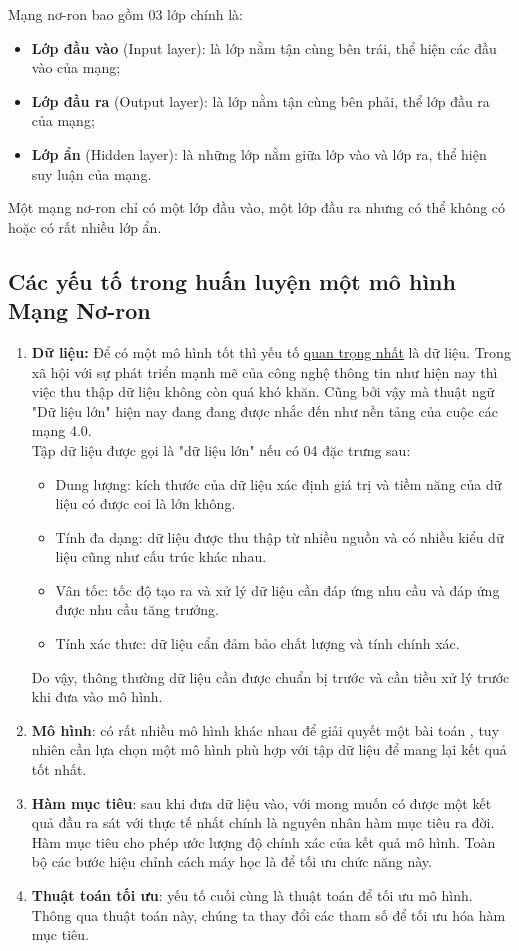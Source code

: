 \documentclass[11pt,a4paper]{article}
\numberwithin{equation}{subsection}
\numberwithin{figure}{subsection}
\numberwithin{table}{subsection}
\begin{document}
Mạng nơ-ron bao gồm 03 lớp chính là:
\begin{itemize}
	\item \textbf{Lớp đầu vào} (Input layer): là lớp nằm tận cùng bên trái, thể hiện các đầu vào của mạng;
	\item \textbf{Lớp đầu ra} (Output layer): là lớp nằm tận cùng bên phải, thể lớp đầu ra của mạng;
	\item \textbf{Lớp ẩn} (Hidden layer): là những lớp nằm giữa lớp vào và lớp ra, thể hiện suy luận của mạng.
\end{itemize}
Một mạng nơ-ron chỉ có một lớp đầu vào, một lớp đầu ra nhưng có thể không có hoặc có rất nhiều lớp ẩn.

\subsection{Các yếu tố trong huấn luyện một mô hình Mạng Nơ-ron}
\begin{enumerate}[-]
\item \textbf{Dữ liệu:} Để có một mô hình tốt thì yếu tố \underline{quan trọng nhất} là dữ liệu. Trong xã hội với sự phát triển mạnh mẽ của công nghệ thông tin như hiện nay thì việc thu thập dữ liệu không còn quá khó khăn.  Cũng bởi vậy mà thuật ngữ "Dữ liệu lớn"  hiện nay đang đang được nhắc đến như nền tảng của cuộc các mạng 4.0.\\
Tập dữ liệu được gọi là "dữ liệu lớn" nếu có 04 đặc trưng sau:
\begin{itemize}
	\item Dung lượng: kích thước của dữ liệu xác định giá trị và tiềm năng của dữ liệu có được coi là lớn không.
	\item Tính đa dạng: dữ liệu được thu thập từ nhiều nguồn và có nhiều kiểu dữ liệu cũng như cấu trúc khác nhau.
	\item Vân tốc: tốc độ tạo ra và xử lý dữ liệu cần đáp ứng nhu cầu và đáp ứng được nhu cầu tăng trưởng.
	\item Tính xác thưc: dữ liệu cẩn đảm bảo chất lượng và tính chính xác.
\end{itemize}
Do vậy, thông thường dữ liệu cần được chuẩn bị trước và cần tiều xử lý trước khi đưa vào mô hình.

\item \textbf{Mô hình}: có rất nhiều mô hình khác nhau để giải quyết một bài toán , tuy nhiên cần lựa chọn một mô hình phù hợp với tập dữ liệu để mang lại kết quả tốt nhất.

\item \textbf{Hàm mục tiêu}: sau khi đưa dữ liệu vào, với mong muốn có được một kết quả đầu ra sát với thực tế nhất chính là nguyên nhân hàm mục tiêu ra đời. Hàm mục tiêu cho phép ước lượng độ chính xác của kết quả mô hình. Toàn bộ các bước hiệu chỉnh cách máy học là để tối ưu chức năng này.

\item \textbf{Thuật toán tối ưu}: yếu tố cuối cùng là thuật toán để tối ưu mô hình. Thông qua thuật toán này, chúng ta thay đổi các tham số để tối ưu hóa hàm mục tiêu.

\end{enumerate}
\end{document}
